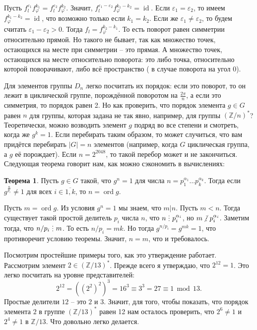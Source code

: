 \documentclass[10pt,a4paper,oneside]{book}
\theoremstyle{definition}
\newtheorem{thm}{\color{red!40!black}Теорема}
\renewcommand{\mod}{\,\operatorname{mod}\,}
\newcommand{\mb}[1]{\mathbb{#1}}
\newcommand{\ovl}{\overline}
\newcommand{\id}{\operatorname{id}}
\newcommand{\ord}{\operatorname{ord}}
\newcommand{\di}{\mathop{\,\scalebox{0.85}{\raisebox{-1.2pt}[0.5\height]{\vdots}}\,}}
\newcommand{\ndi}{\mathop{\not\scalebox{0.85}{\raisebox{-1.2pt}[0.5\height]{\vdots}}\,}}
\def\ffi{\varphi}
\def\eps{\varepsilon}
\def\thrm{\begin{thm}}
\def\ethrm{\end{thm}}
\begin{document}
Пусть $f_l^{\eps_1}f_{\ffi}^{k_1}=f_l^{\eps_2}f_{\ffi}^{k_2}$. Значит, $f_l^{\eps_1-\eps_2}f_{\ffi}^{k_1-k_2}=\id$.
Если $\eps_1=\eps_2$, то имеем $f_{\ffi}^{k_1-k_2}=\id$, что возможно только если $k_1=k_2$. Если же $\eps_1\neq \eps_2$, то будем считать $\eps_1-\eps_2>0$. Тогда $f_{l}=f_{\ffi}^{k_2-k_1}$. То есть поворот равен симметрии относительно прямой. Но такого не бывает, так как множество точек, остающихся на месте при симметрии -- это прямая. А множество точек, остающихся на месте относительно поворота: это либо точка, относительно которой поворачивают, либо всё пространство ( в случае поворота на угол $0$).
\endproof






Для элементов группы $D_n$ легко посчитать их порядок: если это поворот, то он лежит в циклической группе, порождённой поворотом на $\frac{2\pi}{n}$, а если это симметрия, то порядок равен 2. Но как проверить, что порядок элемента  $g\in G$ равен $n$ для группы, которая задана не так явно, например, для группы $(\mb Z/n)^*$? Теоретически, можно возводить элемент $g$ подряд во все степени и смотреть, когда же $g^k=1$. Если перебирать таким образом, то может случиться, что вам придётся перебирать $|G|=n$ элементов (например, когда $G$ циклическая группа, а $g$ её порождает). Если $n=2^{2048}$, то такой перебор может и не закончиться. Следующая теорема говорит нам, как можно сэкономить в вычислениях:

\thrm Пусть $g \in G$ такой, что $g^n=1$ для числа  $n=p_1^{\alpha_1}\dots p_k^{\alpha_k}$. Тогда если $g^{\frac{n}{p_i}}\neq 1$ для всех $i\in\ovl{1,k}$, то $n=\ord g$. 
\ethrm
\proof Пусть $m=\ord g$. Из условия $g^n=1$ мы знаем, что $m | n$. Пусть $m<n$. Тогда существует такой простой делитель $p_i$ числа $n$, что $n\di p_i^{\alpha_i}$, но $m\ndi p_i^{\alpha_i}$. Заметим тогда, что $n/p_i \di m$. То есть $n/p_i=mk$. Но тогда $g^{n/p_i}=g^{mk}=1$, что противоречит условию теоремы. Значит, $n=m$, что и требовалось.
\endproof

Посмотрим простейшие примеры того, как это утверждение работает. Рассмотрим элемент $2\in (\mb Z/13)^*$. Прежде всего я утверждаю, что $2^{12}=1$. Это легко посчитать на уровне представителей:
$$2^{12}=((2^2)^2)^3= 16^3\equiv 3^3 =27 \equiv 1 \mod 13.$$
Простые делители $12$ -- это $2$ и $3$. Значит, для того, чтобы показать, что порядок элемента $2$ в группе $(\mb Z/13)^*$ равен 12 нам осталось проверить, что $2^{6}\neq 1$ и $2^4\neq 1$ в $\mb Z/13$. Что довольно легко делается.
\end{document}
